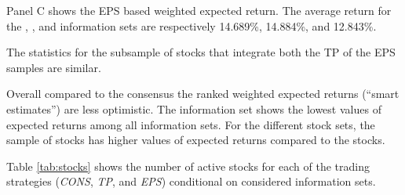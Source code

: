 \documentclass[a4paper,twoside,12pt,openright,notitlepage]{report}\usepackage[]{graphicx}\usepackage[]{color}
\begin{document}
Panel C shows the EPS based weighted expected return. The average return for the \tr{}, \naive{}, and  information sets are respectively 14.689\%, 14.884\%, and 12.843\%.


The statistics for the subsample of stocks that integrate both the TP of the EPS samples are similar.


Overall compared to the consensus the ranked weighted expected returns (``smart estimates'') are less optimistic. The  information set shows the lowest values of expected returns among all information sets. For the different stock sets,  the \same{} sample of stocks has higher values of expected returns compared to the \all{} stocks.

Table \ref{tab:stocks} shows the number of active stocks for each of the trading strategies (\textit{CONS}, \textit{TP}, and \textit{EPS}) conditional on considered information sets.
\end{document}
